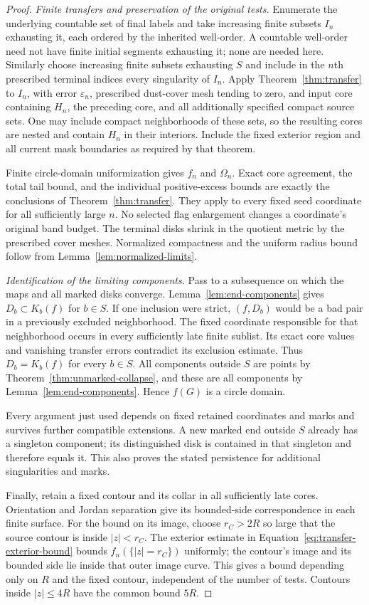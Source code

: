 \begin{proof}
\emph{Finite transfers and preservation of the original tests.}
Enumerate the underlying countable set of final labels and take
increasing finite subsets $I_n$ exhausting it, each ordered by the
inherited well-order.  A countable well-order need not have finite
initial segments exhausting it; none are needed here.
Similarly choose increasing finite subsets exhausting $S$ and include
in the $n$th prescribed terminal indices every singularity of $I_n$.
Apply Theorem~\ref{thm:transfer} to $I_n$, with error
$\varepsilon_n$, prescribed dust-cover mesh tending to zero, and
input core containing $H_n$, the preceding core, and all additionally
specified compact source sets.  One may include compact neighborhoods
of these sets, so the resulting cores are nested and contain $H_n$
in their interiors.  Include the fixed exterior region and all current
mask boundaries as required by that theorem.

Finite circle-domain uniformization gives $f_n$ and $\Omega_n$.
Exact core agreement, the total tail bound, and the individual
positive-excess bounds are exactly the conclusions of
Theorem~\ref{thm:transfer}.  They apply to every fixed seed coordinate
for all sufficiently large $n$.  No selected flag enlargement changes
a coordinate's original band budget.  The terminal disks shrink in
the quotient metric by the prescribed cover meshes.  Normalized
compactness and the uniform radius bound follow from
Lemma~\ref{lem:normalized-limits}.

\emph{Identification of the limiting components.}
Pass to a subsequence on which the maps and all marked disks converge.
Lemma~\ref{lem:end-components} gives $D_b\subset K_b(f)$ for
$b\in S$.  If one inclusion were strict, $(f,D_b)$ would be a bad
pair in a previously excluded neighborhood.  The fixed coordinate
responsible for that neighborhood occurs in every sufficiently late
finite sublist.  Its exact core values and vanishing transfer errors
contradict its exclusion estimate.  Thus $D_b=K_b(f)$ for every
$b\in S$.  All components outside $S$ are points by
Theorem~\ref{thm:unmarked-collapse}, and these are all components by
Lemma~\ref{lem:end-components}.  Hence $f(G)$ is a circle domain.

Every argument just used depends on fixed retained coordinates and
marks and survives further compatible extensions.  A new marked end
outside $S$ already has a singleton component; its distinguished disk
is contained in that singleton and therefore equals it.  This also
proves the stated persistence for additional singularities and marks.

Finally, retain a fixed contour and its collar in all sufficiently
late cores.  Orientation and Jordan separation give its bounded-side
correspondence in each finite surface.  For the bound on its image,
choose $r_C>2R$ so large that the source contour is inside $|z|<r_C$.
The exterior estimate in Equation~\eqref{eq:transfer-exterior-bound}
bounds $f_n(\{|z|=r_C\})$ uniformly; the contour's image and its
bounded side lie inside that outer image curve.  This gives a bound
depending only on $R$ and the fixed contour, independent of the number
of tests.  Contours inside $|z|\le4R$ have the common bound $5R$.
\end{proof}

